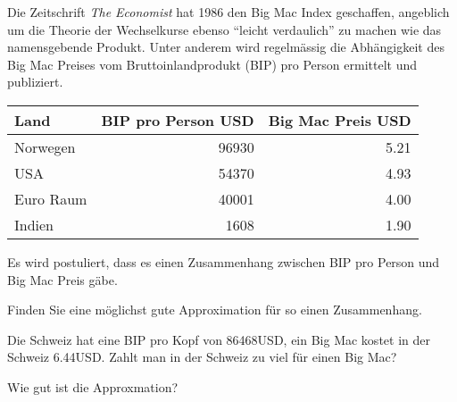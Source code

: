 Die Zeitschrift {\em The Economist} hat 1986 den Big Mac Index geschaffen,
angeblich um die Theorie der Wechselkurse ebenso ``leicht verdaulich''
zu machen wie das namensgebende Produkt.
Unter anderem wird regelmässig die Abhängigkeit des Big Mac Preises
vom Bruttoinlandprodukt (BIP) pro Person ermittelt und publiziert.
\begin{center}
\begin{tabular}{|l|r|r|}
\hline
Land&BIP pro Person USD&Big Mac Preis USD\\
\hline
Norwegen   &96930&5.21\\
USA        &54370&4.93\\
Euro Raum  &40001&4.00\\
Indien     & 1608&1.90\\
\hline
\end{tabular}
\end{center}
Es wird postuliert, dass es einen Zusammenhang zwischen 
BIP pro Person und Big Mac Preis gäbe.


\begin{teilaufgaben}
\item Finden Sie eine möglichst gute Approximation für so einen Zusammenhang.
\item Die Schweiz hat eine BIP pro Kopf von 86468USD, ein Big Mac kostet
in der Schweiz 6.44USD.
Zahlt man in der Schweiz zu viel für einen Big Mac?
\item Wie gut ist die Approxmation?
\end{teilaufgaben}

